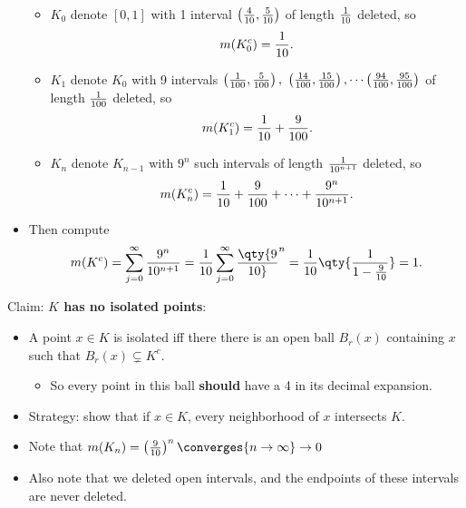\begin{solution}
\begin{itemize}
  \begin{itemize}
  \tightlist
  \item
    \(K_0\) denote \([0, 1]\) with 1 interval
    \(\left({4 \over 10}, {5 \over 10} \right)\) of length
    \(1 \over 10\) deleted, so
    \begin{align*}m(K_0^c) = {1\over 10}.\end{align*}
  \item
    \(K_1\) denote \(K_0\) with 9 intervals
    \(\left({1 \over 100}, {5\over 100}\right), ~\left({14 \over 100}, {15 \over 100}\right), \cdots \left({94\over 100}, {95 \over 100}\right)\)
    of length \({1 \over 100}\) deleted, so
    \begin{align*}m(K_1^c) = {1\over 10} + {9 \over 100}.\end{align*}
  \item
    \(K_n\) denote \(K_{n-1}\) with \(9^{n}\) such intervals of length
    \(1 \over 10^{n+1}\) deleted, so
    \begin{align*}m(K_n^c) = {1\over 10} + {9 \over 100} + \cdots + {9^{n} \over 10^{n+1}}.\end{align*}
  \end{itemize}
\item
  Then compute
  \begin{align*}
  m(K^c) 
  = \sum_{j=0}^\infty {9^n \over 10^{n+1} } 
  = {1\over 10} \sum_{j=0}^\infty \qty{9\over 10}^n 
  = {1 \over 10} \qty{ {1 \over 1 - {9 \over 10 } } } 
  = 1.
  \end{align*}
\end{itemize}

Claim: \textbf{\(K\) has no isolated points}:

\begin{itemize}
\item
  A point \(x\in K\) is isolated iff there there is an open ball
  \(B_r(x)\) containing \(x\) such that \(B_r(x) \subsetneq K^c\).

  \begin{itemize}
  \tightlist
  \item
    So every point in this ball \textbf{should} have a 4 in its decimal
    expansion.
  \end{itemize}
\item
  Strategy: show that if \(x\in K\), every neighborhood of \(x\)
  intersects \(K\).
\item
  Note that
  \(m(K_n) = \left( \frac 9 {10} \right)^n \converges{n\to\infty}\to 0\)
\item
  Also note that we deleted open intervals, and the endpoints of these
  intervals are never deleted.


\end{itemize}
\end{solution}
